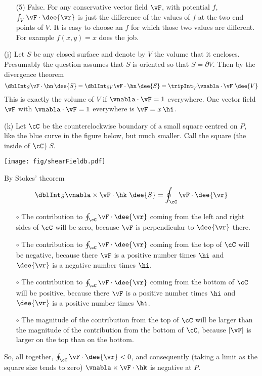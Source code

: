 \begin{solution}
\begin{itemize}
\item[(5)] False. For any conservative vector field $\vF$, with potential $f$,
$\int_V \vF\cdot\dee{\vr}$ is just the difference of the values of $f$ at 
the two end points of $V$. It is easy to choose an $f$ for which those
two values are different. For example $f(x,y)=x$ does the job.


\end{itemize} 

\noindent (j)
Let $S$ be any closed surface and denote by $V$ the 
volume that it encloses. Presumably  the question assumes that
$S$ is oriented so that $S=\partial V$. Then by the divergence 
theorem
\begin{equation*}
\dblInt_S \vF \cdot \hn\,\dee{S}
=\dblInt_{\partial V} \vF \cdot \hn\,\dee{S}
=\tripInt_V \vnabla\cdot\vF\ \dee{V}
\end{equation*}
This is exactly the volume of $V$ if $\vnabla\cdot\vF=1$
everywhere. One vector field $\vF$ with $\vnabla\cdot\vF=1$
everywhere is $\vF=x\,\hi$.

\noindent (k)
Let $\cC$ be the counterclockwise boundary of a small square centred
on $P$, like the blue curve in the figure below, but much smaller. 
Call the square (the inside of $\cC$) $S$.

  \begin{center}
       \texttt{[image: fig/shearFieldb.pdf]}
  \end{center}

By Stokes' theorem
\begin{equation*}
\dblInt_S \vnabla\times\vF\cdot\hk\ \dee{S}
=\oint_\cC \vF\cdot\dee{\vr}
\end{equation*}
\begin{itemize}\itemsep1pt \parskip0pt  %
\item[$\circ$]
The contribution to $\oint_\cC \vF\cdot\dee{\vr}$ coming from the left and
right sides of $\cC$ will be zero, because $\vF$ is perpendicular 
to $\dee{\vr}$ there. 
\item[$\circ$]
The contribution to $\oint_\cC \vF\cdot\dee{\vr}$ coming from the
top of $\cC$ will be negative, because there $\vF$ is a positive number times
$\hi$ and $\dee{\vr}$ is a negative number times $\hi$.
\item[$\circ$]
The contribution to $\oint_\cC \vF\cdot\dee{\vr}$ coming from the
bottom of $\cC$ will be positive, because there $\vF$ is a positive 
number times $\hi$ and $\dee{\vr}$ is a positive number times $\hi$.
\item[$\circ$]
The magnitude of the contribution from the top of $\cC$ will be
larger than the magnitude of the contribution from the bottom of $\cC$,
because $|\vF|$ is larger on the top than on the bottom.
\end{itemize} 
So, all together, $\oint_\cC \vF\cdot\dee{\vr}<0$, and consequently
(taking a limit as the square size tends to zero)
$\vnabla\times\vF\cdot\hk$ is negative at $P$.

\end{solution}

